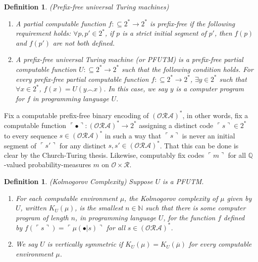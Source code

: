 \documentclass{article}
\newtheorem{definition}[theorem]{Definition}
\begin{document}
\begin{definition}
    (Prefix-free universal Turing machines)
    \begin{enumerate}
        \item A partial computable function $f:\subseteq 2^*\to 2^*$
        is \emph{prefix-free} if the following requirement holds:
        $\forall p,p'\in 2^*$, if $p$ is a strict initial segment of $p'$,
        then $f(p)$ and $f(p')$ are not both defined.
        \item A \emph{prefix-free universal Turing machine}
        (or \emph{PFUTM}) is a prefix-free
        partial computable function $U:\subseteq 2^*\to 2^*$
        such that the following condition holds.
        For every prefix-free partial computable function
        $f:\subseteq 2^*\to 2^*$, $\exists y\in 2^*$ such that
        $\forall x\in 2^*$, $f(x)=U(y\frown x)$.
        In this case, we say $y$ is a \emph{computer program for
        $f$ in programming language $U$}.
    \end{enumerate}
\end{definition}

Fix a computable prefix-free binary encoding of
$(\mathcal O \mathcal R\mathcal A)^*$, in other words,
fix a computable function
$\ulcorner\bullet\urcorner:(\mathcal O \mathcal R\mathcal A)^*\to 2^*$
assigning a distinct code $\ulcorner s\urcorner\in 2^*$ to every sequence
$s\in (\mathcal O \mathcal R\mathcal A)^*$ in such a way that
$\ulcorner s\urcorner$ is never an initial segment of $\ulcorner s'\urcorner$
for any distinct $s,s'\in (\mathcal O \mathcal R\mathcal A)^*$.
That this can be done is clear by the Church-Turing thesis.
Likewise, computably fix codes $\ulcorner m\urcorner$ for all
$\mathbb Q$-valued probability-measures $m$ on $\mathcal O\times\mathcal R$.

\begin{definition}
(Kolmogorov Complexity)
Suppose $U$ is a PFUTM.
\begin{enumerate}
    \item
    For each computable environment $\mu$, the \emph{Kolmogorov complexity of $\mu$
    given by $U$}, written $K_U(\mu)$, is the smallest $n\in\mathbb N$ such that
    there is some computer program of length $n$, in programming language $U$,
    for the function
    $f$
    defined by
    $f(\ulcorner s\urcorner)=\ulcorner \mu(\bullet|s)\urcorner$
    for all $s\in (\mathcal O \mathcal R\mathcal A)^*$.
    \item
    We say $U$ is \emph{vertically symmetric} if
    $K_U(\mu)=K_U(\overline\mu)$ for every computable environment $\mu$.
\end{enumerate}
\end{definition}
\end{document}
